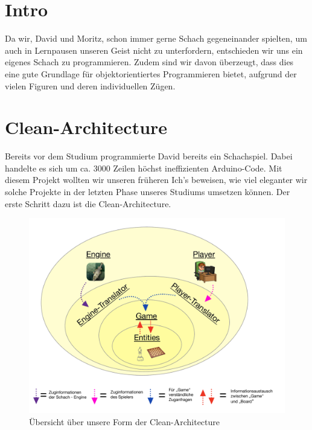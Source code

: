 \documentclass[
10pt, %
a4paper, %
oneside, %
headinclude,footinclude, %
BCOR5mm, %
]{scrartcl}
\begin{document}
\newpage %
\begin{onehalfspace}
\section{Intro}

Da wir, David und Moritz, schon immer gerne Schach gegeneinander spielten, um auch in Lernpausen unseren Geist nicht zu unterfordern, entschieden wir uns ein eigenes Schach zu programmieren. 
Zudem sind wir davon überzeugt, dass dies eine gute Grundlage für objektorientiertes Programmieren bietet, aufgrund der vielen Figuren und deren individuellen Zügen.

\section{Clean-Architecture} \label{sec:cleanArc}
Bereits vor dem Studium programmierte David bereits ein Schachspiel. Dabei handelte es sich um ca. 3000 Zeilen höchst ineffizienten Arduino-Code. Mit diesem Projekt wollten wir unseren früheren Ich's beweisen, wie viel eleganter wir solche Projekte in der letzten Phase unseres Studiums umsetzen können. Der erste Schritt dazu ist die Clean-Architecture.

\begin{figure}[h]
	\begin{center}
		\includegraphics[width = \textwidth]{onion.pdf}
		\caption{Übersicht über unsere Form der Clean-Architecture}
		\label{pic:cleanArc}
	\end{center}
\end{figure}



\end{onehalfspace}
\end{document}
